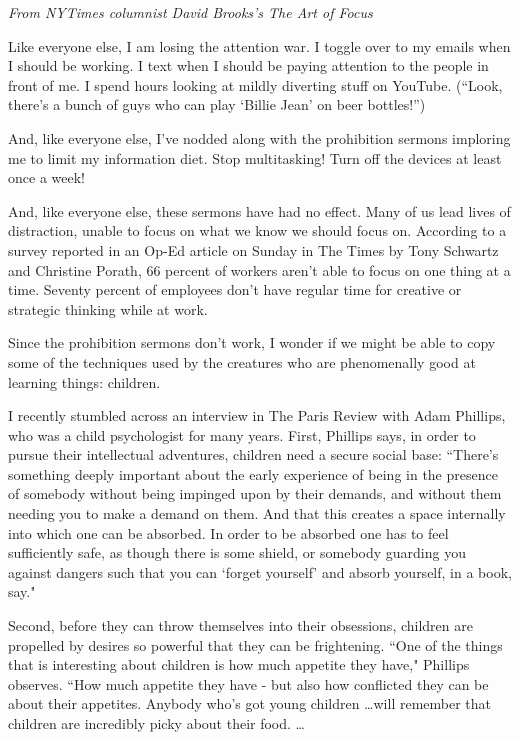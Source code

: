 \newpage
\textit{From NYTimes columnist David Brooks's The Art of Focus}

\bigskip
\begin{linenumbers*}
\modulolinenumbers[5]
\indent Like everyone else, I am losing the attention war. I toggle over to my emails when I should be working. I text when I should be paying attention to the people in front of me. I spend hours looking at mildly diverting stuff on YouTube. (“Look, there's a bunch of guys who can play ‘Billie Jean' on beer bottles!”) 

\indent And, like everyone else, I've nodded along with the prohibition sermons imploring me to limit my information diet. Stop multitasking! Turn off the devices at least once a week!

\indent And, like everyone else, these sermons have had no effect. Many of us lead lives of distraction, unable to focus on what we know we should focus on. According to a survey reported in an Op-Ed article on Sunday in The Times by Tony Schwartz and Christine Porath, 66 percent of workers aren't able to focus on one thing at a time. Seventy percent of employees don't have regular time for creative or strategic thinking while at work.

\indent Since the prohibition sermons don't work, I wonder if we might be able to copy some of the techniques used by the creatures who are phenomenally good at learning things: children.

\indent I recently stumbled across an interview in The Paris Review with Adam Phillips, who was a child psychologist for many years. First, Phillips says, in order to pursue their intellectual adventures, children need a secure social base:
``There's something deeply important about the early experience of being in the presence of somebody without being impinged upon by their demands, and without them needing you to make a demand on them. And that this creates a space internally into which one can be absorbed. In order to be absorbed one has to feel sufficiently safe, as though there is some shield, or somebody guarding you against dangers such that you can ‘forget yourself' and absorb yourself, in a book, say."

\indent Second, before they can throw themselves into their obsessions, children are propelled by desires so powerful that they can be frightening. ``One of the things that is interesting about children is how much appetite they have," Phillips observes. “How much appetite they have - but also how conflicted they can be about their appetites. Anybody who's got young children \ldots will remember that children are incredibly picky about their food. \ldots


\end{linenumbers*}
